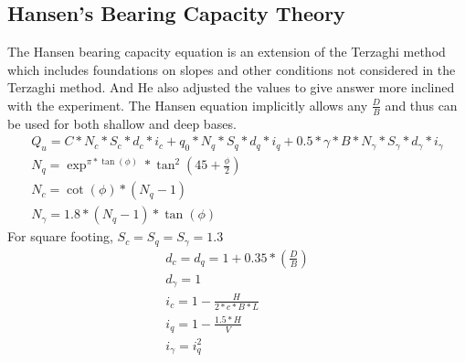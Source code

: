 \subsection{Hansen’s Bearing Capacity Theory}
The Hansen bearing capacity equation is an extension of the Terzaghi method which includes foundations on slopes and other conditions not considered in the Terzaghi method. And He also adjusted the values to give answer more inclined with the experiment. The Hansen equation implicitly allows any $\frac{D}{B}$ and thus can be used for both shallow and deep bases.
\begin{gather}
Q_u = C * N_c * S_c * d_c * i_c + q_0 * N_q * S_q * d_q * i_q + 0.5 * {\gamma} * B * N_{\gamma}*S_{\gamma}*d_{\gamma} * i_{\gamma}\\
N_q = \exp^{\pi * \tan(\phi)} * \tan^2 ( 45 + \frac{\phi}{2} )\\
N_c = \cot(\phi)*(N_q - 1)\\
N_{\gamma} = 1.8 * (N_q-1) * \tan(\phi)
\end{gather}
For square footing,
$S_c = S_q = S_{\gamma} = 1.3$
\begin{gather}
d_c=d_q = 1+0.35*(\frac{D}{B})\\
d_{\gamma} = 1\\
i_c=1 - \frac{H}{2*c*B*L}\\
i_q=1 - \frac{1.5*H}{V}\\
i_{\gamma} = i_q^2  
\end{gather}

